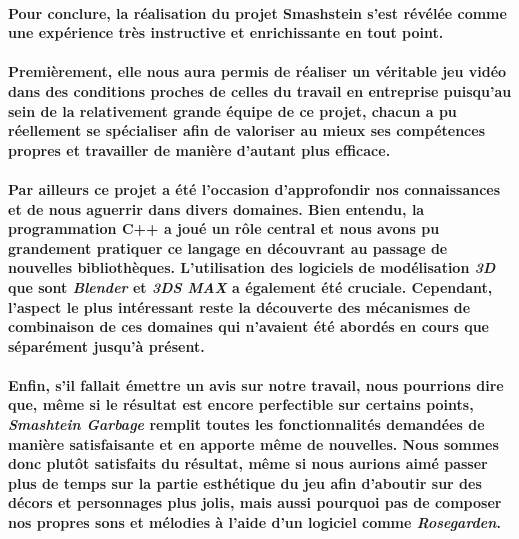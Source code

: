 \paragraph{Pour conclure, la réalisation du projet Smashstein s’est révélée comme une expérience très instructive et enrichissante en tout point.}

\paragraph{Premièrement, elle nous aura permis de réaliser un véritable jeu vidéo dans des conditions proches de celles du travail en entreprise puisqu’au sein de la relativement grande équipe de ce projet, chacun a pu réellement se spécialiser afin de valoriser au mieux ses compétences propres et travailler de manière d’autant plus efficace.}

\paragraph{Par ailleurs ce projet a été l’occasion d’approfondir nos connaissances et de nous aguerrir dans divers domaines. Bien entendu, la programmation C++ a joué un rôle central et nous avons pu grandement pratiquer ce langage en découvrant au passage de nouvelles bibliothèques. L’utilisation des logiciels de modélisation \textit{3D} que sont \textit{Blender} et \textit{3DS MAX} a également été cruciale. Cependant, l’aspect le plus intéressant reste la découverte des mécanismes de combinaison de ces domaines qui n’avaient été abordés en cours que séparément jusqu’à présent.}

\paragraph{Enfin, s’il fallait émettre un avis sur notre travail, nous pourrions dire que, même si le résultat est encore perfectible sur certains points, \textit{Smashtein Garbage} remplit toutes les fonctionnalités demandées de manière satisfaisante et en apporte même de nouvelles. Nous sommes donc plutôt satisfaits du résultat, même si nous aurions aimé passer plus de temps sur la partie esthétique du jeu afin d’aboutir sur des décors et personnages plus jolis, mais aussi pourquoi pas de composer nos propres sons et mélodies à l’aide d’un logiciel comme \textit{Rosegarden}.}